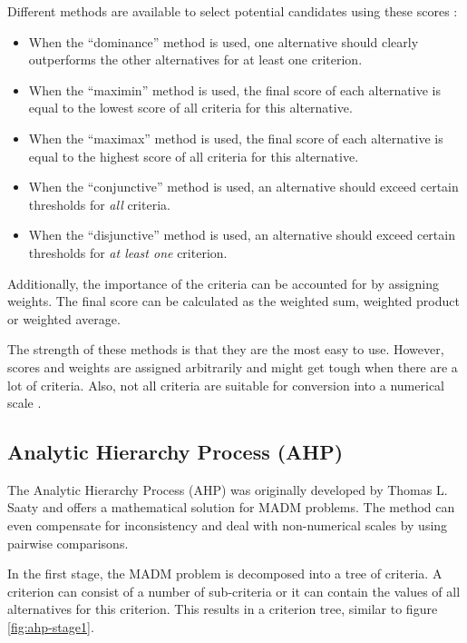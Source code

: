 Different methods are available to select potential candidates using these scores \cite{Kahraman:2008}:

\begin{itemize}
    \item When the ``dominance'' method is used, one alternative should clearly outperforms the other alternatives for at least one criterion. 
    \item When the ``maximin'' method is used, the final score of each alternative is equal to the lowest score of all criteria for this alternative.
    \item When the ``maximax'' method is used, the final score of each alternative is equal to the highest score of all criteria for this alternative.
    \item When the ``conjunctive'' method is used, an alternative should exceed certain thresholds for \emph{all} criteria.
    \item When the ``disjunctive'' method is used, an alternative should exceed certain thresholds for \emph{at least one} criterion. 
\end{itemize}

Additionally, the importance of the criteria can be accounted for by assigning weights. The final score can be calculated as the weighted sum, weighted product or weighted average.

The strength of these methods is that they are the most easy to use. However,  scores and weights are assigned arbitrarily and might get tough when there are a lot of criteria. Also, not all criteria are suitable for conversion into a numerical scale \cite{Jadhav:2009}.

\subsection{Analytic Hierarchy Process (AHP)}
\label{sec:ahp}

The Analytic Hierarchy Process (AHP) was originally developed by Thomas L. Saaty and offers a mathematical solution for MADM problems. The method can even compensate for inconsistency and deal with non-numerical scales by using pairwise comparisons.

In the first stage, the MADM problem is decomposed into a tree of criteria. A criterion can consist of a number of sub-criteria or it can contain the values of all alternatives for this criterion. This results in a criterion tree, similar to figure \ref{fig:ahp-stage1}.

